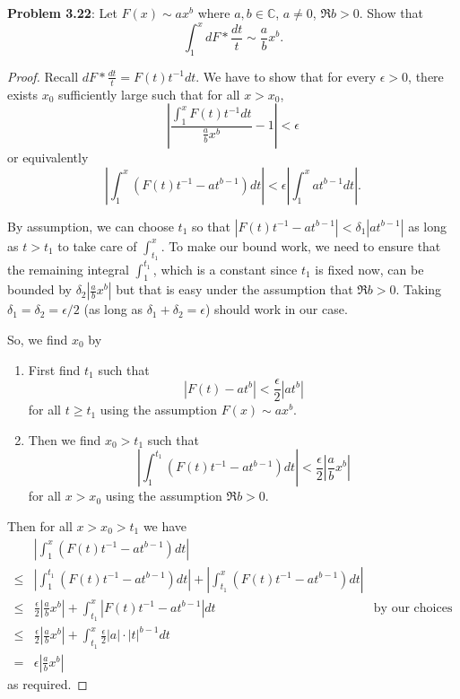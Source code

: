 \documentclass[12pt]{article}
\newcommand{\C}{\mathbb{C}}
\newcommand{\Abs}[1]{\left| #1 \right|}
\begin{document}
\fi

\textbf{Problem 3.22}: Let $F(x) \sim ax^b$ where $a, b \in \C$, $a \not= 0$, $\Re b > 0$. Show that
$$\int_1^x dF * \frac{dt}{t} \sim \frac{a}{b} x^b.$$

\begin{proof}
Recall $dF * \frac{dt}{t} = F(t) t^{-1} dt$. We have to show that for every $\epsilon > 0$, there exists $x_0$ sufficiently large such that for all $x > x_0$,
$$\Abs{ \frac{\int_1^x F(t) t^{-1} dt}{\frac{a}{b} x^b} - 1 } < \epsilon$$
or equivalently
$$\Abs{ \int_1^x (F(t) t^{-1} - a t^{b-1}) dt} < \epsilon \Abs{ \int_1^x a t^{b-1} dt }.$$

By assumption, we can choose $t_1$ so that $\Abs{ F(t) t^{-1} - a t^{b-1} } < \delta_1 \Abs{ a t^{b-1} }$  as long as $t > t_1$ to take care of $\int_{t_1}^x$. To make our bound work, we need to ensure that the remaining integral $\int_1^{t_1}$, which is a constant since $t_1$ is fixed now, can be bounded by $\delta_2 \Abs{\frac{a}{b} x^b}$ but that is easy under the assumption that $\Re b > 0$. Taking $\delta_1 = \delta_2 = \epsilon /2$ (as long as $\delta_1 + \delta_2 = \epsilon$) should work in our case.

So, we find $x_0$ by
\begin{enumerate}
\item First find $t_1$ such that
$$\Abs{ F(t) - a t^b } < \frac\epsilon{2} \Abs{ a t^b }$$
for all $t \geq t_1$ using the assumption $F(x) \sim ax^b$.
\item Then we find $x_0 > t_1$ such that
$$\Abs{ \int_1^{t_1} (F(t) t^{-1} - a t^{b-1}) dt } < \frac\epsilon2 \Abs{\frac{a}{b} x^b}$$
for all $x > x_0$ using the assumption $\Re b > 0$.
\end{enumerate}

Then for all $x > x_0 > t_1$ we have
\begin{align*}
&\Abs{ \int_1^x (F(t) t^{-1} - a t^{b-1}) dt}\\
\leq &\Abs{ \int_1^{t_1} (F(t) t^{-1} - a t^{b-1}) dt} + \Abs{ \int_{t_1}^x (F(t) t^{-1} - a t^{b-1}) dt}\\
\leq & \frac\epsilon2 \Abs{ \frac{a}{b} x^b } + \int_{t_1}^x \Abs{F(t) t^{-1} - a t^{b-1}} dt &\text{by our choices}\\
\leq & \frac\epsilon2 \Abs{ \frac{a}{b} x^b } + \int_{t_1}^x \frac\epsilon{2} |a| \cdot |t|^{b-1} dt\\
=& \epsilon \Abs{ \frac{a}{b} x^b }
\end{align*}
as required.
\end{proof}

\unless\ifdefined\IsMainDocument
\end{document}
